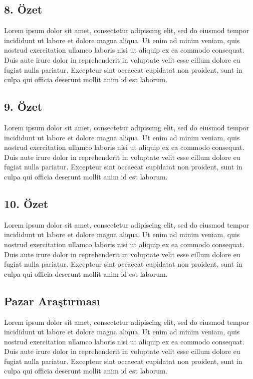 \subsection{8. Özet}
Lorem ipsum dolor sit amet, consectetur adipiscing elit, sed do eiusmod tempor incididunt ut labore et dolore magna aliqua. Ut enim ad minim veniam, quis nostrud exercitation ullamco laboris nisi ut aliquip ex ea commodo consequat. Duis aute irure dolor in reprehenderit in voluptate velit esse cillum dolore eu fugiat nulla pariatur. Excepteur sint occaecat cupidatat non proident, sunt in culpa qui officia deserunt mollit anim id est laborum.
\subsection{9. Özet}
Lorem ipsum dolor sit amet, consectetur adipiscing elit, sed do eiusmod tempor incididunt ut labore et dolore magna aliqua. Ut enim ad minim veniam, quis nostrud exercitation ullamco laboris nisi ut aliquip ex ea commodo consequat. Duis aute irure dolor in reprehenderit in voluptate velit esse cillum dolore eu fugiat nulla pariatur. Excepteur sint occaecat cupidatat non proident, sunt in culpa qui officia deserunt mollit anim id est laborum.
\subsection{10. Özet}
Lorem ipsum dolor sit amet, consectetur adipiscing elit, sed do eiusmod tempor incididunt ut labore et dolore magna aliqua. Ut enim ad minim veniam, quis nostrud exercitation ullamco laboris nisi ut aliquip ex ea commodo consequat. Duis aute irure dolor in reprehenderit in voluptate velit esse cillum dolore eu fugiat nulla pariatur. Excepteur sint occaecat cupidatat non proident, sunt in culpa qui officia deserunt mollit anim id est laborum.
\subsection{Pazar Araştırması}
Lorem ipsum dolor sit amet, consectetur adipiscing elit, sed do eiusmod tempor incididunt ut labore et dolore magna aliqua. Ut enim ad minim veniam, quis nostrud exercitation ullamco laboris nisi ut aliquip ex ea commodo consequat. Duis aute irure dolor in reprehenderit in voluptate velit esse cillum dolore eu fugiat nulla pariatur. Excepteur sint occaecat cupidatat non proident, sunt in culpa qui officia deserunt mollit anim id est laborum.


